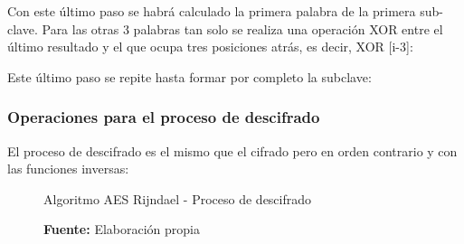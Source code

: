 \documentclass[../main/main.tex]{subfiles}
\begin{document}
\begin{enumerate}[label=\textbf{\arabic*}.]
          Con este último paso se habrá calculado la primera palabra de la primera sub-clave. Para las otras 3 palabras tan solo se realiza una operación XOR entre el último resultado y el que ocupa tres posiciones atrás, es decir, XOR [i-3]:
          
          \begin{table}[H]
            \centering
            
          \end{table}

          Este último paso se repite hasta formar por completo la subclave:

          
      \end{enumerate}

    \subsubsection{Operaciones para el proceso de descifrado}
      El proceso de descifrado es el mismo que el cifrado pero en orden contrario y con las funciones inversas:

      \begin{figure}[H]
        \centering
        \caption{Algoritmo AES Rijndael - Proceso de descifrado}
        
        \caption*{\textbf{Fuente:} Elaboración propia}
      \end{figure}
\end{document}
